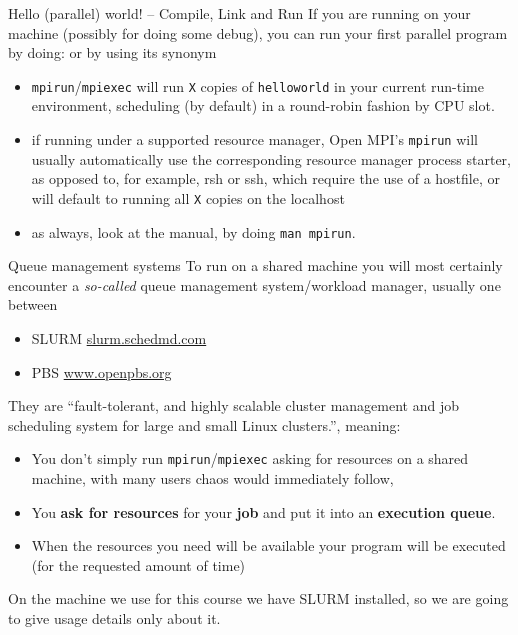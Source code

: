 \documentclass[xcolor={svgnames,usenames}]{beamer}
\begin{document}
\begin{frame}[fragile]{Hello (parallel) world! -- Compile, Link and Run}
If you are running on your machine (possibly for doing some debug), you can run your first parallel program by doing:
or by using its synonym
\begin{itemize}
	\item<1-> \texttt{mpirun}/\texttt{mpiexec} will  run  \texttt{X} copies of \texttt{helloworld} in your current run-time environment, scheduling (by default) in a round-robin fashion by CPU slot.
	\item<1-> if running under a supported resource manager, Open MPI's \texttt{mpirun} will usually automatically use the corresponding resource manager process starter, as opposed to, for example, rsh or ssh, which require the use of a hostfile, or will default  to  running all \texttt{X} copies on the localhost 
	\item<2-> as always, look at the manual, by doing \texttt{man mpirun}.
\end{itemize}

\end{frame}

\begin{frame}{Queue management systems}
To run on a shared machine you will most certainly encounter a \emph{so-called} queue management system/workload manager, usually one between
\begin{itemize}
	\item SLURM \href{https://slurm.schedmd.com/}{slurm.schedmd.com}
	\item PBS \href{https://www.openpbs.org/}{www.openpbs.org}
\end{itemize}
They are ``fault-tolerant, and highly scalable cluster management and job scheduling system for large and small Linux clusters.'', meaning:
\begin{itemize}
	\item You don't simply run \texttt{mpirun}/\texttt{mpiexec} asking for resources on a shared machine, with many users chaos would immediately follow,
	\item You \textbf{ask for resources} for your \textbf{job} and put it into an \textbf{execution queue}. 
	\item When the resources you need will be available your program will be executed (for the requested amount of time)
\end{itemize}

On the machine we use for this course we have \alert{SLURM} installed, so we are going to give usage details only about it.

\end{frame}
\end{document}
